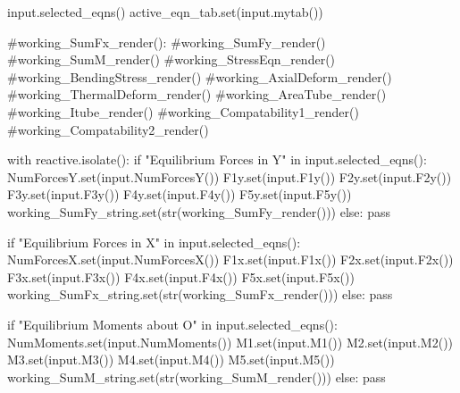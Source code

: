\documentclass[
  letterpaper,
  DIV=11,
  numbers=noendperiod]{scrreprt}
\newenvironment{Shaded}{\begin{snugshade}}{\end{snugshade}}
\newcommand{\NormalTok}[1]{\textcolor[rgb]{0.00,0.23,0.31}{#1}}
\begin{document}
\begin{Shaded}
\begin{Highlighting}[]
\NormalTok{        input.selected\_eqns()}
\NormalTok{        active\_eqn\_tab.set(input.mytab())}
        
        
\NormalTok{        \#working\_SumFx\_render():}
\NormalTok{        \#working\_SumFy\_render()}
\NormalTok{        \#working\_SumM\_render()}
\NormalTok{        \#working\_StressEqn\_render()}
\NormalTok{        \#working\_BendingStress\_render()}
\NormalTok{        \#working\_AxialDeform\_render()}
\NormalTok{        \#working\_ThermalDeform\_render()}
\NormalTok{        \#working\_AreaTube\_render()}
\NormalTok{        \#working\_Itube\_render()}
\NormalTok{        \#working\_Compatability1\_render()}
\NormalTok{        \#working\_Compatability2\_render()}
                
\NormalTok{        with reactive.isolate():}
\NormalTok{            if "Equilibrium Forces in Y" in input.selected\_eqns(): }
\NormalTok{                NumForcesY.set(input.NumForcesY())}
\NormalTok{                F1y.set(input.F1y())}
\NormalTok{                F2y.set(input.F2y())}
\NormalTok{                F3y.set(input.F3y())}
\NormalTok{                F4y.set(input.F4y())}
\NormalTok{                F5y.set(input.F5y())}
\NormalTok{                working\_SumFy\_string.set(str(working\_SumFy\_render()))}
\NormalTok{            else:}
\NormalTok{                 pass             }
    
\NormalTok{            if "Equilibrium Forces in X" in input.selected\_eqns(): }
\NormalTok{                NumForcesX.set(input.NumForcesX())}
\NormalTok{                F1x.set(input.F1x())}
\NormalTok{                F2x.set(input.F2x())}
\NormalTok{                F3x.set(input.F3x())}
\NormalTok{                F4x.set(input.F4x())}
\NormalTok{                F5x.set(input.F5x())}
\NormalTok{                working\_SumFx\_string.set(str(working\_SumFx\_render()))}
\NormalTok{            else:}
\NormalTok{                 pass}
                              
\NormalTok{            if "Equilibrium Moments about O" in input.selected\_eqns(): }
\NormalTok{                NumMoments.set(input.NumMoments())}
\NormalTok{                M1.set(input.M1())}
\NormalTok{                M2.set(input.M2())}
\NormalTok{                M3.set(input.M3())}
\NormalTok{                M4.set(input.M4())}
\NormalTok{                M5.set(input.M5())}
\NormalTok{                working\_SumM\_string.set(str(working\_SumM\_render()))}
\NormalTok{            else:}
\NormalTok{                 pass}
                

\end{Highlighting}
\end{Shaded}
\end{document}
